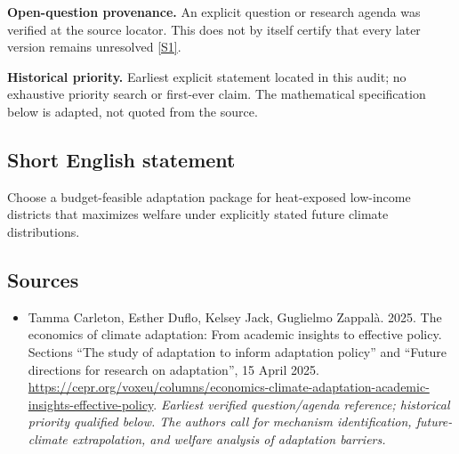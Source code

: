 \documentclass[11pt]{article}
\newcommand{\sref}[2]{\hyperlink{source:#1:#2}{[S#2]}}
\begin{document}
\par\textbf{Open-question provenance.} An explicit question or research agenda was verified at the source locator. This does not by itself certify that every later version remains unresolved \sref{30007715}{1}.

\par\textbf{Historical priority.} Earliest explicit statement located in this audit; no exhaustive priority search or first-ever claim. The mathematical specification below is adapted, not quoted from the source.

\subsection{Short English statement}
Choose a budget-feasible adaptation package for heat-exposed low-income districts that maximizes welfare under explicitly stated future climate distributions.

\subsection{Sources}
\begin{itemize}\raggedright
\item[\textnormal{[S1]}]\hypertarget{source:30007715:1}{} Tamma Carleton, Esther Duflo, Kelsey Jack, Guglielmo Zappalà. 2025. The economics of climate adaptation: From academic insights to effective policy. Sections “The study of adaptation to inform adaptation policy” and “Future directions for research on adaptation”, 15 April 2025.
\url{https://cepr.org/voxeu/columns/economics-climate-adaptation-academic-insights-effective-policy}.
{\small\textit{Earliest verified question/agenda reference; historical priority qualified below. The authors call for mechanism identification, future-climate extrapolation, and welfare analysis of adaptation barriers.}}
\end{itemize}
\end{document}
